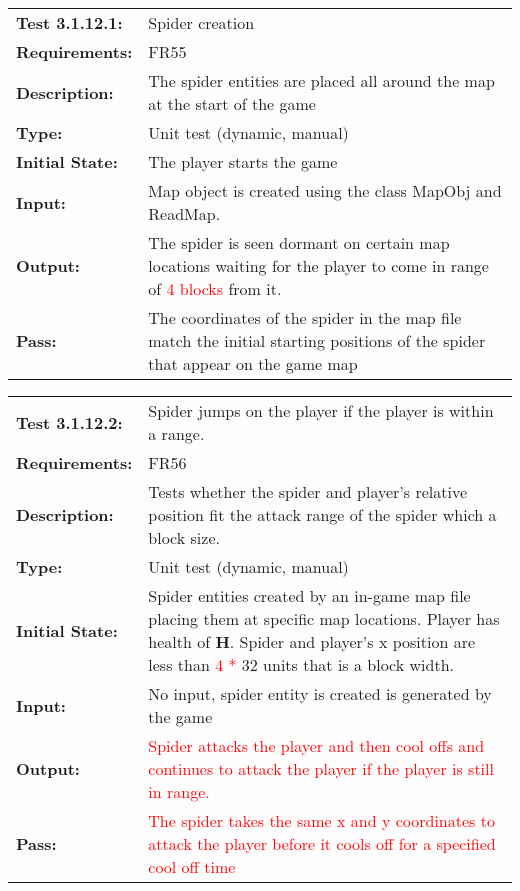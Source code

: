 \documentclass[12pt, titlepage]{article}
\begin{document}
\begin{tabular}{|l|p{10cm}|}
    \hline
    \bf{Test} 3.1.12.1: & Spider creation\\
    \bf{Requirements}: & FR55 \\
    \bf{Description}: & The spider entities are placed all around the map at the start of the game\\
    \bf{Type}:  &  Unit test (dynamic, manual)   \\
    \bf{Initial State}: & The player starts the game \\
    \bf{Input}: & Map object is created using the class MapObj and ReadMap. \\
    \bf{Output}: & The spider is seen  dormant on certain map locations waiting for the player to come in range of \textcolor{red}{4 blocks} from it. \\
    \bf{Pass}: &  The coordinates of the spider in the map file match the initial starting positions of the spider that appear on the game map\\
    \hline
\end{tabular}

\begin{tabular}{|l|p{10cm}|}
    \hline
    \bf{Test} 3.1.12.2: & Spider jumps on the player if the player is within a range. \\
    \bf{Requirements}: & FR56 \\
    \bf{Description}: & Tests whether the spider and player's relative position fit the attack range of the spider which a block size.\\
    \bf{Type}:  &  Unit test (dynamic, manual)    \\
    \bf{Initial State}: & Spider entities created by an in-game map file placing them at specific map locations. Player has health of $\mathbf{H}$. Spider and player's x position are less than \textcolor{red}{4 *} 32 units that is a block width. \\
    \bf{Input}: & No input, spider entity is created is generated by the game \\
    \bf{Output}: & \textcolor{red}{Spider attacks the player and then cool offs and continues to attack the player if the player is still in range.}  \\
    \bf{Pass}: & \textcolor{red}{The spider takes the same x and y coordinates to attack the player before it cools off for a specified cool off time}\\
    \hline
\end{tabular}
\end{document}

